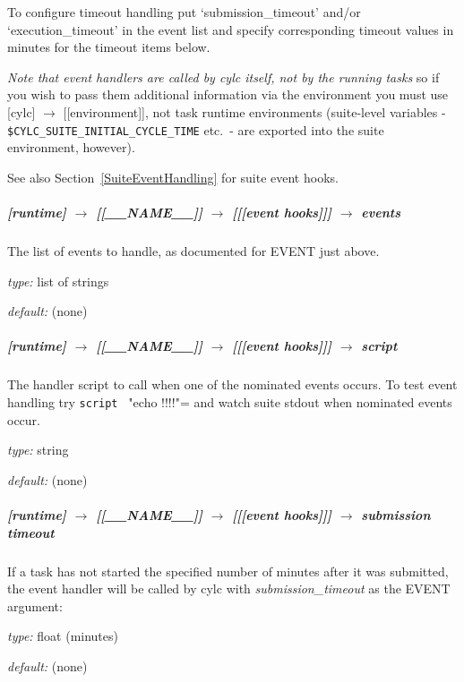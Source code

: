 To configure timeout handling put `submission\_timeout' and/or
`execution\_timeout' in the event list and specify corresponding timeout
values in minutes for the timeout items below.

{\em Note that event handlers are called by cylc itself, not by the 
running tasks} so if you wish to pass them additional information via
the environment you must use [cylc] $\rightarrow$ [[environment]],
not task runtime environments (suite-level variables -
\lstinline=$CYLC_SUITE_INITIAL_CYCLE_TIME=
etc.\ - are exported into the suite environment, however).

See also Section~\ref{SuiteEventHandling} for suite event hooks.

\subparagraph[events]{[runtime] $\rightarrow$ [[\_\_NAME\_\_]] $\rightarrow$ [[[event hooks]]] $\rightarrow$ events }

The list of events to handle, as documented for EVENT just above.
\begin{myitemize}
    \item {\em type:} list of strings
    \item {\em default:} (none)
\end{myitemize}

\subparagraph[script]{[runtime] $\rightarrow$ [[\_\_NAME\_\_]] $\rightarrow$ [[[event hooks]]] $\rightarrow$ script}

The handler script to call when one of the nominated events occurs. To
test event handling try \lstinline=script = "echo !!!!"= and watch suite
stdout when nominated events occur.

\begin{myitemize}
    \item {\em type:} string
    \item {\em default:} (none)
\end{myitemize}

\subparagraph[submission timeout]{[runtime] $\rightarrow$ [[\_\_NAME\_\_]] $\rightarrow$ [[[event hooks]]] $\rightarrow$ submission timeout}

If a task has not started the specified number of minutes after it was
submitted, the event handler will be called by cylc with 
{\em submission\_timeout} as the EVENT argument:
\begin{myitemize}
    \item {\em type:} float (minutes)
    \item {\em default:} (none)
\end{myitemize}

